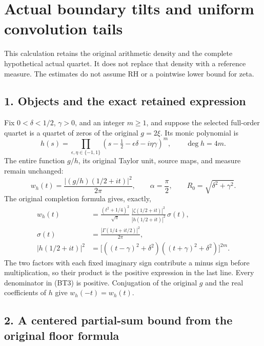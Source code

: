 \section{Actual boundary tilts and uniform convolution tails}\label{GraphV2:actual-boundary-tilts-and-uniform-convolution-tails}

This calculation retains the original arithmetic density and the complete hypothetical actual quartet. It does not replace that density with a reference measure. The estimates do not assume RH or a pointwise lower bound for zeta.

\subsection{1. Objects and the exact retained expression}\label{GraphV2:objects-and-the-exact-retained-expression}

Fix \(0<\delta<1/2\), \(\gamma>0\), and an integer \(m\ge1\), and suppose the selected full-order quartet is a quartet of zeros of the original \(g=2\xi\). Its monic polynomial is \[
h(s)=\prod_{\epsilon,\eta\in\{-1,1\}}
 (s-\tfrac12-\epsilon\delta-i\eta\gamma)^m,
\qquad \deg h=4m.
\tag{BT1}
\] The entire function \(g/h\), its original Taylor unit, source maps, and measure remain unchanged: \[
w_h(t)=\frac{|(g/h)(1/2+it)|^2}{2\pi},\qquad
\alpha=\frac\pi2,\qquad R_0=\sqrt{\delta^2+\gamma^2}.
\tag{BT2}
\] The original completion formula gives, exactly, \[
\begin{split}
w_h(t)
&=\frac{(t^2+1/4)^2}{\sqrt\pi}\,
 \frac{|\zeta(1/2+it)|^2}{|h(1/2+it)|^2}\,\sigma(t),\\
\sigma(t)
&=\frac{|\Gamma(1/4+it/2)|^2}{2\pi},\\
|h(1/2+it)|^2
&=\bigl[((t-\gamma)^2+\delta^2)
              ((t+\gamma)^2+\delta^2)\bigr]^{2m}.
\end{split}
\tag{BT3}
\] The two factors with each fixed imaginary sign contribute a minus sign before multiplication, so their product is the positive expression in the last line. Every denominator in (BT3) is positive. Conjugation of the original \(g\) and the real coefficients of \(h\) give \(w_h(-t)=w_h(t)\).

\subsection{2. A centered partial-sum bound from the original floor formula}\label{GraphV2:a-centered-partial-sum-bound-from-the-original-floor-formula}

